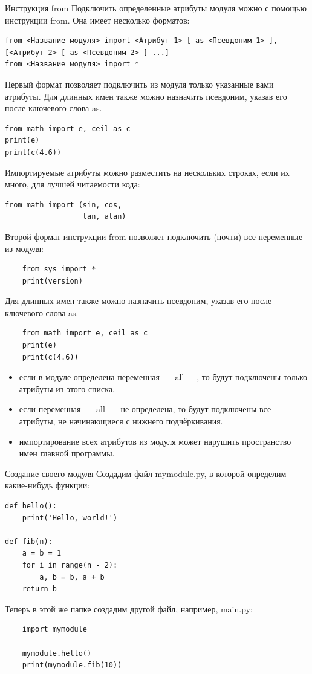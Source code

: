 \documentclass[xcolor=table]{beamer}
\begin{document}
\begin{frame}[fragile]{Инструкция from}
	Подключить определенные атрибуты модуля можно с помощью инструкции from. Она
имеет несколько форматов: 	
	\begin{verbatim}
from <Название модуля> import <Атрибут 1> [ as <Псевдоним 1> ], [<Атрибут 2> [ as <Псевдоним 2> ] ...]
from <Название модуля> import *
	\end{verbatim}
	
	Первый формат позволяет подключить из модуля только указанные вами атрибуты. Для длинных имен также можно назначить псевдоним, указав его после ключевого слова as.
	\begin{verbatim}
from math import e, ceil as c
print(e)
print(c(4.6))
	\end{verbatim}
	
	Импортируемые атрибуты можно разместить на нескольких строках, если их много, для лучшей читаемости кода:	
	\begin{verbatim}
from math import (sin, cos,
                  tan, atan)
	\end{verbatim}
\end{frame}

\begin{frame}[fragile]
	Второй формат инструкции from позволяет подключить (почти) все переменные из модуля: 	
	\begin{verbatim}
	from sys import *
	print(version)
	\end{verbatim}
	
	Для длинных имен также можно назначить псевдоним, указав его после ключевого слова as.
	\begin{verbatim}
	from math import e, ceil as c
	print(e)
	print(c(4.6))
	\end{verbatim}
	
	\begin{itemize}
		\item если в модуле определена переменная \_\_all\_\_, то будут подключены только атрибуты из этого списка. 
		\item если переменная \_\_all\_\_ не определена, то будут подключены все атрибуты, не начинающиеся с нижнего подчёркивания. 
		\item импортирование всех атрибутов из модуля может нарушить пространство имен главной программы.
	\end{itemize}
\end{frame}

\begin{frame}[fragile]{Создание своего модуля}
	Создадим файл mymodule.py, в которой определим какие-нибудь функции: 	
	\begin{verbatim}
def hello():
	print('Hello, world!')

def fib(n):
	a = b = 1
	for i in range(n - 2):
		a, b = b, a + b
	return b
	\end{verbatim}
	
	Теперь в этой же папке создадим другой файл, например, main.py:
	\begin{verbatim}
	import mymodule
	
	mymodule.hello()
	print(mymodule.fib(10))
	\end{verbatim}
\end{frame}
\end{document}
